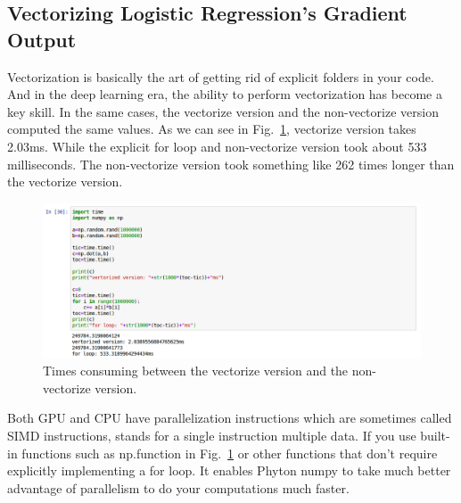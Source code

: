\documentclass[a4paper]{article}
\begin{document}
\subsection{Vectorizing Logistic Regression's Gradient Output}
Vectorization is basically the art of getting rid of explicit folders in your code. And in the deep learning era, the ability to perform vectorization has become a key skill. In the same cases, the vectorize version and the non-vectorize version computed the same values. As we can see in Fig.~\ref{p9}, vectorize version takes 2.03ms. While the explicit for loop and non-vectorize version took about 533 milliseconds. The non-vectorize version took something like 262 times longer than the vectorize version.
\begin{figure}
	\begin{center}
		\includegraphics[scale=0.4]{figures/10.png}
	\end{center}
	\caption{Times consuming between the vectorize version and the non-vectorize version.}
	\label{p9}
\end{figure}

Both GPU and CPU have parallelization instructions which are sometimes called SIMD instructions, stands for a single instruction multiple data. If you use built-in functions such as np.function in Fig.~\ref{p9} or other functions that don't require explicitly implementing a for loop. It enables Phyton numpy to take much better advantage of parallelism to do your computations much faster.
\end{document}
